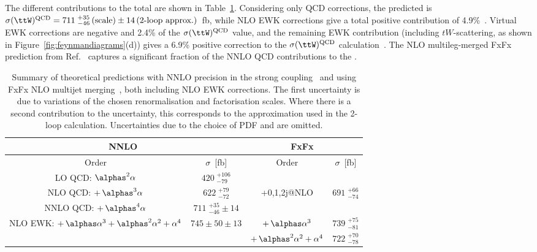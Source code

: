 \documentclass[cernpreprint, atlasdraft=false, texlive=2023, UKenglish, texmf, orcidlogo]{atlasdoc}
\begin{document}
 
The different contributions to the total \ttW \xs are shown in
Table~\ref{tab:intro_ttW}. Considering only QCD corrections, the
predicted \xs is $\sigma(\ttW)^{\textrm{QCD}} =
711\;^{+35}_{-46}\,\textrm{(scale)} \pm 14\,\textrm{(2-loop
approx.)}$~fb, while NLO EWK corrections give a total positive
contribution of 4.9\%~\cite{Buonocore_2023}. Virtual EWK
corrections are negative and 2.4\% of the
$\sigma(\ttW)^{\textrm{QCD}}$ value, and the remaining EWK contribution
(including $tW$-scattering, as shown in
Figure~\ref{fig:feynmandiagrams}(d)) gives a 6.9\% positive correction
to the $\sigma(\ttW)^{\textrm{QCD}}$
calculation~\cite{Frederix:2021agh}. The NLO multileg-merged FxFx
prediction from Ref.~\cite{Frederix:2021agh} captures a significant
fraction of the NNLO QCD contributions to the \xs.
 
 
\begin{table}[htbp]
\begin{center}
\caption{Summary of theoretical predictions with NNLO precision in the strong coupling~\cite{Buonocore_2023} and using FxFx NLO multijet merging~\cite{Frederix:2021agh}, both including NLO EWK corrections. The first uncertainty is due to variations of the chosen renormalisation and factorisation scales. Where there is a second contribution to the uncertainty, this corresponds to the approximation used in the 2-loop calculation. Uncertainties due to the choice of PDF and \alphas are omitted. \label{tab:intro_ttW}}
\renewcommand*\arraystretch{1.3}
\begin{tabular}{c|c|c|c}
\hline \hline
\multicolumn{2}{c|}{NNLO~\cite{Buonocore_2023}} & \multicolumn{2}{c}{FxFx~\cite{Frederix:2021agh}}  \\
\hline
Order & $\sigma$~[fb]  &   Order & $\sigma$~[fb]  \\
\hline
LO QCD:   $\alphas^2\alpha$    & $420\;^{+106}_{-79}$ & & \\
NLO QCD:  $+\,\alphas^3\alpha$ & $622\;^{+79}_{-72}$ & \ttW{}+0,1,2j@NLO & $691\;^{+66}_{-74}$\\
NNLO QCD: $+\,\alphas^4\alpha$ & $711\;^{+35}_{-46}\pm 14$ & &  \\
\hline
\multirow{ 2}{*}{NLO EWK: $+\,\alphas\alpha^3+ \alphas^2\alpha^2 + \alpha^4$} & \multirow{ 2}{*}{$745 \pm 50 \pm 13$} & $+\,\alphas\alpha^3$   & $739\;^{+75}_{-81}$ \\
& & $+\,\alphas^2\alpha^2 + \alpha^4$                                                     & $722\;^{+70}_{-78}$ \\
\hline  \hline
\end{tabular}
\end{center}
\end{table}
 
\end{document}
